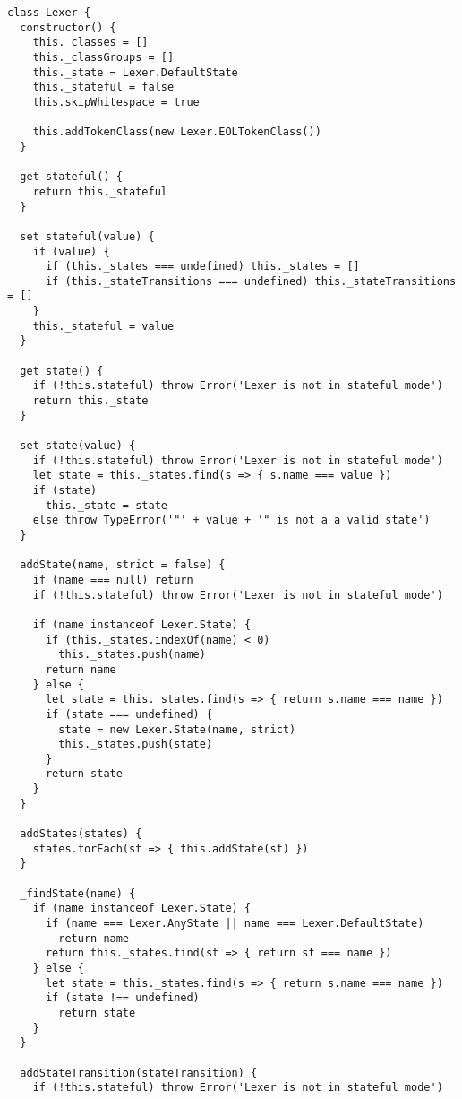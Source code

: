 \begin{lstlisting}[frame=single]
class Lexer {
  constructor() {
    this._classes = []
    this._classGroups = []
    this._state = Lexer.DefaultState
    this._stateful = false
    this.skipWhitespace = true
    
    this.addTokenClass(new Lexer.EOLTokenClass())
  }
  
  get stateful() {
    return this._stateful
  }
  
  set stateful(value) {
    if (value) {
      if (this._states === undefined) this._states = []
      if (this._stateTransitions === undefined) this._stateTransitions = []
    }
    this._stateful = value
  }
  
  get state() {
    if (!this.stateful) throw Error('Lexer is not in stateful mode')
    return this._state
  }
  
  set state(value) {
    if (!this.stateful) throw Error('Lexer is not in stateful mode')
    let state = this._states.find(s => { s.name === value })
    if (state)
      this._state = state
    else throw TypeError('"' + value + '" is not a a valid state')
  }
  
  addState(name, strict = false) {
    if (name === null) return
    if (!this.stateful) throw Error('Lexer is not in stateful mode')
    
    if (name instanceof Lexer.State) {
      if (this._states.indexOf(name) < 0)
        this._states.push(name)
      return name
    } else {
      let state = this._states.find(s => { return s.name === name })
      if (state === undefined) {
        state = new Lexer.State(name, strict)
        this._states.push(state)
      }
      return state
    }
  }
  
  addStates(states) {
    states.forEach(st => { this.addState(st) })
  }
  
  _findState(name) {
    if (name instanceof Lexer.State) {
      if (name === Lexer.AnyState || name === Lexer.DefaultState)
        return name
      return this._states.find(st => { return st === name })
    } else {
      let state = this._states.find(s => { return s.name === name })
      if (state !== undefined)
        return state
    }
  }
  
  addStateTransition(stateTransition) {
    if (!this.stateful) throw Error('Lexer is not in stateful mode')
    

\end{lstlisting}
